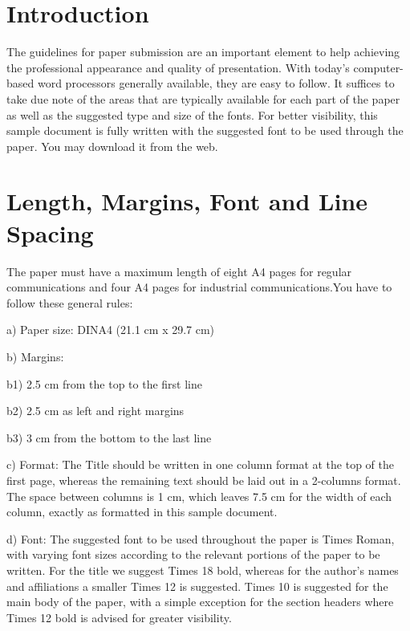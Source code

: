 \documentclass{IEEEconfA4}
\begin{document}
\section{Introduction}

The guidelines for paper submission are an important element to help achieving the professional appearance and quality of presentation. With today's computer-based word processors generally available, they are easy to follow. It suffices to take due note of the areas that are typically available for each part of the paper as well as the suggested type and size of the fonts. For better visibility, this sample document is fully written with the suggested font to be used through the paper. You may download it from the web.

\section{Length, Margins, Font and Line Spacing}

The paper must have a maximum length of eight A4 pages for regular communications and four A4 pages for industrial communications.You have to follow these general rules:


\noindent a)	Paper size: DINA4 (21.1 cm x 29.7 cm)

\noindent b)	Margins:

\hspace{0.2cm} b1) 2.5 cm from the top to the first line

\hspace{0.2cm} b2) 2.5 cm as left and right margins

\hspace{0.2cm} b3) 3 cm from the bottom to the last line

\noindent c)	Format: The Title should be written in one column format at the top of the first page, whereas the remaining text should be laid out in a 2-columns format. The space between columns is 1 cm, which leaves 7.5 cm for the width of each column, exactly as formatted in this sample document.

\noindent d)	Font: The suggested font to be used throughout the paper is Times Roman, with varying font sizes according to the relevant portions of the paper to be written. For the title we suggest Times 18 bold, whereas for the author's names and affiliations a smaller Times 12 is suggested. Times 10 is suggested for the main body of the paper, with a simple exception for the section headers where Times 12 bold is advised for greater visibility.
\end{document}
